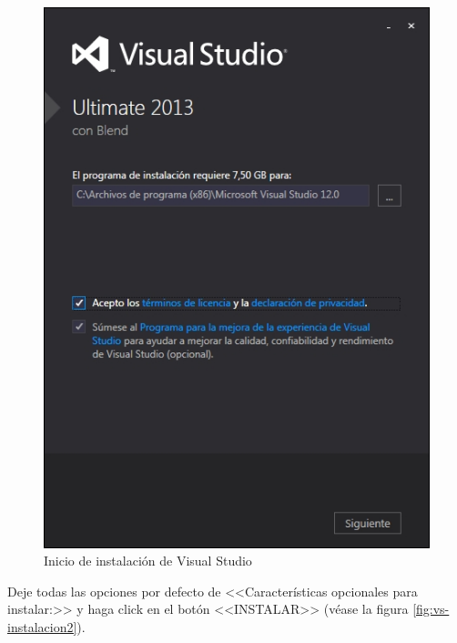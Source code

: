 \begin{figure}[H]
  \centering
  \includegraphics[width=.8\linewidth]{./img/vs-instalacion1.jpg}
\caption[]{Inicio de instalaci\'{o}n de Visual Studio\label{fig:vs-instalacion1}}
\end{figure}

\vfill

\newpage
Deje todas las opciones por defecto de <<Caracter\'{i}sticas opcionales para instalar:>> y haga click en el bot\'{o}n <<INSTALAR>> (v\'{e}ase la figura \ref{fig:vs-instalacion2}).	

\vfill

